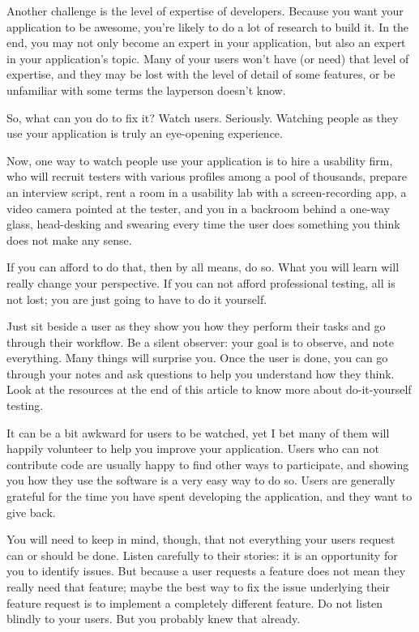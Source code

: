 Another challenge is the level of expertise of developers. Because you want your application to be awesome, you're likely to do a lot of research to build it. In the end, you may not only become an expert in your application, but also an expert in your application's topic. Many of your users won't have (or need) that level of expertise, and they may be lost with the level of detail of some features, or be unfamiliar with some terms the layperson doesn't know.

So, what can you do to fix it? Watch users. Seriously. Watching people as they use your application is truly an eye-opening experience.

Now, one way to watch people use your application is to hire a usability firm, who will recruit testers with various profiles among a pool of thousands, prepare an interview script, rent a room in a usability lab with a screen-recording app, a video camera pointed at the tester, and you in a backroom behind a one-way glass, head-desking and swearing every time the user does something you think does not make any sense.

If you can afford to do that, then by all means, do so. What you will learn will really change your perspective. If you can not afford professional testing, all is not lost; you are just going to have to do it yourself.

Just sit beside a user as they show you how they perform their tasks and go through their workflow. Be a silent observer: your goal is to observe, and note everything. Many things will surprise you. Once the user is done, you can go through your notes and ask questions to help you understand how they think. Look at the resources at the end of this article to know more about do-it-yourself testing.

It can be a bit awkward for users to be watched, yet I bet many of them will happily volunteer to help you improve your application. Users who can not contribute code are usually happy to find other ways to participate, and showing you how they use the software is a very easy way to do so. Users are generally grateful for the time you have spent developing the application, and they want to give back.

You will need to keep in mind, though, that not everything your users request can or should be done. Listen carefully to their stories: it is an opportunity for you to identify issues. But because a user requests a feature does not mean they really need that feature; maybe the best way to fix the issue underlying their feature request is to implement a completely different feature. Do not listen blindly to your users. But you probably knew that already. 

